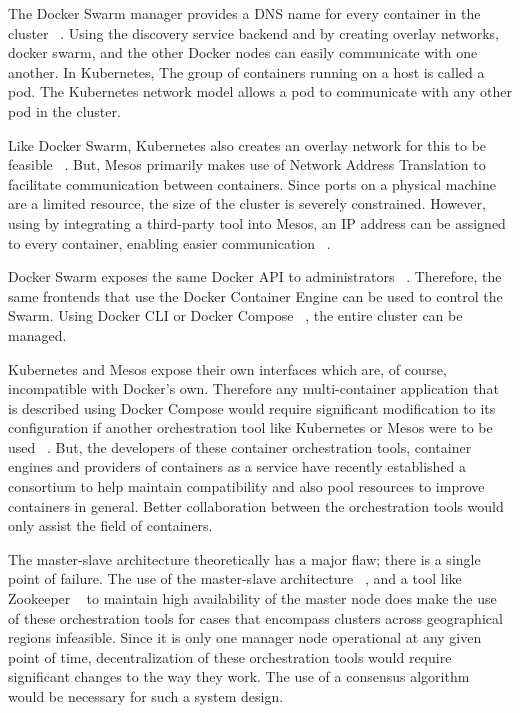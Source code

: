 \documentclass[10pt,twocolumn]{article}
\begin{document}
The Docker Swarm manager provides a DNS name for every container in the cluster ~\cite{intro_docker}.
Using the discovery service backend and by creating overlay networks, docker swarm, and the other Docker nodes can easily communicate with one another.
In Kubernetes, The group of containers running on a host is called a pod.
The Kubernetes network model allows a pod to communicate with any other pod in the cluster.

Like Docker Swarm, Kubernetes also creates an overlay network for this to be feasible ~\cite{platform9_dockerswarm_kubernetes}.
But, Mesos primarily makes use of Network Address Translation to facilitate communication between containers.
Since ports on a physical machine are a limited resource, the size of the cluster is severely constrained.
However, using by integrating a third-party tool into Mesos, an IP address can be assigned to every container, enabling easier communication ~\cite{platform9_mesos_kubernetes}.

Docker Swarm exposes the same Docker API to administrators ~\cite{docker_swarm}.
Therefore, the same frontends that use the Docker Container Engine can be used to control the Swarm.
Using Docker CLI or Docker Compose ~\cite{docker_compose}, the entire cluster can be managed.

Kubernetes and Mesos expose their own interfaces which are, of course, incompatible with Docker's own.
Therefore any multi-container application that is described using Docker Compose would require significant modification to its configuration if another orchestration tool like Kubernetes or Mesos were to be used ~\cite{kubernetes, mesos}.
But, the developers of these container orchestration tools, container engines and providers of containers as a service have recently established a consortium to help maintain compatibility and also pool resources to improve containers in general.
Better collaboration between the orchestration tools would only assist the field of containers.

The master-slave architecture theoretically has a major flaw; there is a single point of failure.
The use of the master-slave architecture ~\cite{docker_swarm, kubernetes, mesos}, and a tool like Zookeeper ~\cite{zookeeper} to maintain high availability of the master node does make the use of these orchestration tools for cases that encompass clusters across geographical regions infeasible.
Since it is only one manager node operational at any given point of time, decentralization of these orchestration tools would require significant changes to the way they work.
The use of a consensus algorithm ~\cite{paxos, raft} would be necessary for such a system design.
\end{document}
